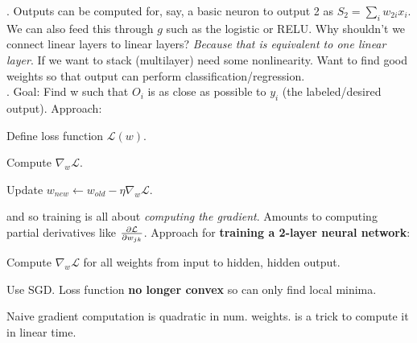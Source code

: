 \documentclass[12pt]{article}
\newcommand\p{\Needspace{10\baselineskip} \noindent}
\begin{document}

\p {}. Outputs can be computed for, say, a basic neuron to output 2 as $ S_2 = \sum_i w_{2i} x_i$. We can also feed this through  $g$ such as the logistic or RELU. Why shouldn't we connect linear layers to linear layers? \textit{Because that is equivalent to one linear layer}. If we want to stack (multilayer) need some nonlinearity. Want to find good weights so that output can perform classification/regression. \\

\p {}. Goal: Find w such that $O_i$ is as close as possible to $y_i$ (the labeled/desired output). Approach:
\begin{compactitem}[$\rightarrow$]
	\item Define loss function $\mathcal{L}(w)$. 
	\item Compute $\nabla_w \mathcal{L}$. 
	\item Update $w_{new} \leftarrow w_{old} - \eta \nabla_w \mathcal{L}$. 
\end{compactitem}
and so training is all about \textit{computing the gradient}. Amounts to computing partial derivatives like $ \frac{\partial \mathcal{L}}{\partial w_{jk}} $. Approach for \textbf{training a 2-layer neural network}:
\begin{compactitem}[$\rightarrow$]
	\item Compute $\nabla_{w}\mathcal{L}$ for all weights from input to hidden, hidden output. 
	\item Use SGD. Loss function \textbf{no longer convex} so can only find local minima. 
	\item Naive gradient computation is quadratic in num. weights.  is a trick to compute it in linear time.  \\
\end{compactitem}
\end{document}
